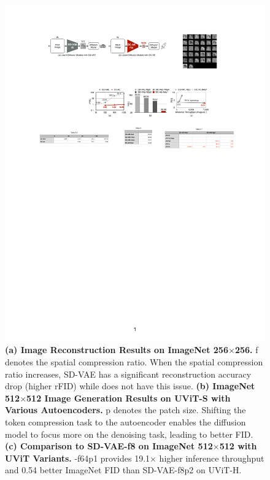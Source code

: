 \begin{figure}[t]
    \centering
    \includegraphics[width=1\linewidth]{figures/src/figure1_results.pdf}
    \vspace{-15pt}
    \caption{\textbf{(a) Image Reconstruction Results on ImageNet 256$\times$256.} f denotes the spatial compression ratio. When the spatial compression ratio increases, SD-VAE has a significant reconstruction accuracy drop (higher rFID) while \modelshort does not have this issue. \textbf{(b) ImageNet 512$\times$512 Image Generation Results on UViT-S with Various Autoencoders.} p denotes the patch size. Shifting the token compression task to the autoencoder enables the diffusion model to focus more on the denoising task, leading to better FID. \textbf{(c) Comparison to SD-VAE-f8 on ImageNet 512$\times$512 with UViT Variants.} \modelshort-f64p1 provides 19.1$\times$ higher inference throughput and 0.54 better ImageNet FID than SD-VAE-f8p2 on UViT-H.}
    \vspace{-10pt}
    \label{fig:figure1_results}
\end{figure}
